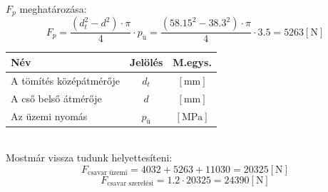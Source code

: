 \documentclass[10pt, a4paper]{article}
\newcommand{\n}{\mathrm{\left[N\right]}}
\newcommand{\mpa}{\mathrm{\left[MPa\right]}}
\newcommand{\mm}{\mathrm{\left[mm\right]}}
\begin{document}
	$F_p$ meghatározása:
	\begin{equation}
		F_p = \dfrac{(d_t^2 - d^2) \cdot \pi}{4} \cdot p_\text{ü} =  \dfrac{(58.15^2 - 38.3^2) \cdot \pi}{4} \cdot 3.5 = 5263 \n\tag{4.2}
	\end{equation}
	\vspace{-15pt}
	\renewcommand{\arraystretch}{1.4}
				\begin{table}[!h]
					\centering
					\begin{tabular}{l|c|c}
						\textbf{Név}                              & \textbf{Jelölés} & \textbf{M.egys.} \\ \hline
						A tömítés középátmérője                     & $d_t$                & $\mm$          \\
						A cső belső átmérője           & $d$                & $\mm$			\\
						Az üzemi nyomás              & $p_\text{ü}$                & $\mpa$          
					\end{tabular}
				\end{table}
	\renewcommand{\arraystretch}{1}\\
	Mostmár vissza tudunk helyettesíteni:
	\begin{equation}
		F_\text{csavar üzemi} = 4032 + 5263 + 11030 = 20325 \n\tag{4.3}
	\end{equation}
	\begin{equation}
		F_\text{csavar szerelési} = 1.2 \cdot 20325 = 24390 \n\tag{4}
	\end{equation}
	\newpage
\end{document}
